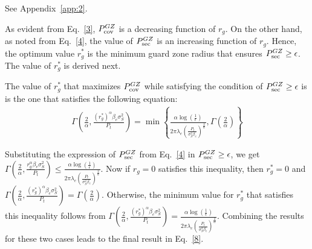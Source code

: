 \documentclass[final]{IEEEtran}
\begin{document}
\begin{IEEEproof}
See Appendix~\ref{app:2}.
\end{IEEEproof}
As evident from Eq.~\ref{3}, $P_{\rm cov}^{GZ}$ is a decreasing function of $r_g$. On the other hand, as noted from Eq.~\ref{4}, the value of $P_{\rm sec}^{GZ}$ is an increasing function of $r_g$. Hence, the optimum value $r_g^{*}$ is the minimum guard zone radius that ensures $P_{\rm sec}^{GZ}\geq\epsilon$. The value of $r_g^{*}$ is derived next.
\begin{lemma}\label{lem:2}
The value of $r_g^{*}$ that maximizes $P_{\rm cov}^{GZ}$ while satisfying the condition of $P_{\rm sec}^{GZ}\geq\epsilon$ is is the one that satisfies the following equation:
\begin{align}
\label{8}
\Gamma\left(\frac{2}{\alpha},\frac{(r_g^*)^{\alpha}\beta_e\sigma_S^2}{P_t}\right)=\min\left\{\frac{\alpha\log\left(\frac{1}{\epsilon}\right)}{2\pi\lambda_{e}\left(\frac{P_{t}}{\sigma_S^2\beta_e}\right)^{\frac{2}{\alpha}}},\Gamma\left(\frac{2}{\alpha}\right)\right\}
\end{align}
\end{lemma}
\begin{IEEEproof}
Substituting the expression of $P_{\rm sec}^{GZ}$ from Eq.~\ref{4} in $P_{\rm sec}^{GZ}\geq\epsilon$, we get $\Gamma\left(\frac{2}{\alpha},\frac{r_g^{\alpha}\beta_e\sigma_S^2}{P_{t}}\right)\leq\frac{\alpha\log\left(\frac{1}{\epsilon}\right)}{2\pi\lambda_{e}\left(\frac{P_{t}}{\sigma_S^2\beta_e}\right)^{\frac{2}{\alpha}}}$. Now if $r_g=0$ satisfies this inequality, then $r_g^*=0$ and $\Gamma\left(\frac{2}{\alpha},\frac{(r_g^*)^{\alpha}\beta_e\sigma_S^2}{P_{t}}\right)=\Gamma\left(\frac{2}{\alpha}\right)$.
Otherwise, the minimum value for $r_g^*$ that satisfies this inequality follows from $\Gamma\left(\frac{2}{\alpha},\frac{(r_g^*)^{\alpha}\beta_e\sigma_S^2}{P_{t}}\right)=\frac{\alpha\log\left(\frac{1}{\epsilon}\right)}{2\pi\lambda_{e}\left(\frac{P_{t}}{\sigma_S^2\beta_e}\right)^{\frac{2}{\alpha}}}$. Combining the results for these two cases leads to the final result in Eq.~\ref{8}.
\end{IEEEproof} 
\vspace{-6mm}
\end{document}
